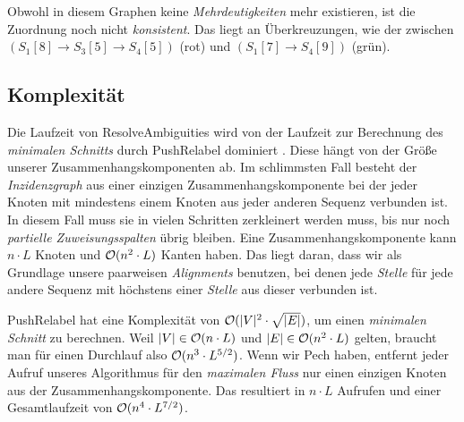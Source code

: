 \begin{center}
\end{center}

Obwohl in diesem Graphen keine \emph{Mehrdeutigkeiten} mehr existieren, ist die Zuordnung noch nicht \emph{konsistent}. Das liegt an Überkreuzungen, wie der zwischen $(S_1[8] \rightarrow S_3[5] \rightarrow S_4[5])$ (rot) und $(S_1[7] \rightarrow S_4[9])$ (grün). 

\subsection{Komplexität}

Die Laufzeit von \textrm{ResolveAmbiguities} wird von der Laufzeit zur Berechnung des \emph{minimalen Schnitts} durch \textrm{PushRelabel} dominiert \citep{cpm10}. Diese hängt von der Größe unserer Zusammenhangskomponenten ab. Im schlimmsten Fall besteht der \emph{Inzidenzgraph} aus einer einzigen Zusammenhangskomponente bei der jeder Knoten mit mindestens einem Knoten aus jeder anderen Sequenz verbunden ist. In diesem Fall muss sie in vielen Schritten zerkleinert werden muss, bis nur noch \emph{partielle Zuweisungsspalten} übrig bleiben. Eine Zusammenhangskomponente kann $n\cdot L$ Knoten und $\mathcal{O}(n^2\cdot L)$ Kanten haben. Das liegt daran, dass wir als Grundlage unsere paarweisen \emph{Alignments} benutzen, bei denen jede \emph{Stelle} für jede andere Sequenz mit höchstens einer \emph{Stelle} aus dieser verbunden ist. 

\textrm{PushRelabel} hat eine Komplexität von $\mathcal{O}(|V|^2\cdot \sqrt{|E|})$, um einen \emph{minimalen Schnitt} zu berechnen. Weil $|V| \in \mathcal{O}(n\cdot L)$ und $|E| \in \mathcal{O}(n^2\cdot L)$ gelten, braucht man für einen Durchlauf also $\mathcal{O}(n^3\cdot L^{5/2})$. Wenn wir Pech haben, entfernt jeder Aufruf unseres Algorithmus für den \emph{maximalen Fluss} nur einen einzigen Knoten aus der Zusammenhangskomponente. Das resultiert in $n\cdot L$ Aufrufen und einer Gesamtlaufzeit von $\mathcal{O}(n^4\cdot L^{7/2})$.

